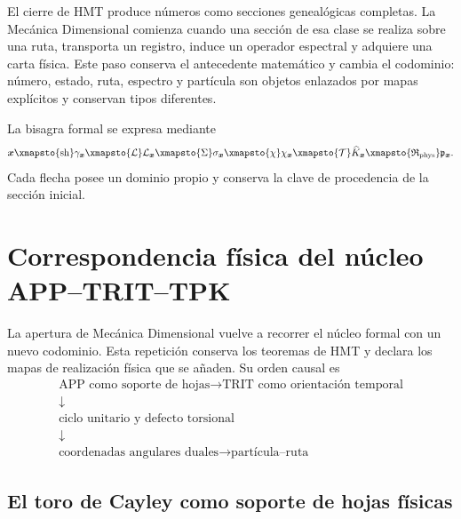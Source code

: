 \label{chap:realizacion-espectral-numero-particula}

El cierre de HMT produce números como secciones genealógicas completas. La
Mecánica Dimensional comienza cuando una sección de esa clase se realiza sobre
una ruta, transporta un registro, induce un operador espectral y adquiere una
carta física. Este paso conserva el antecedente matemático y cambia el
codominio: número, estado, ruta, espectro y partícula son objetos enlazados
por mapas explícitos y conservan tipos diferentes.

La bisagra formal se expresa mediante
\begin{equation}
 \boldsymbol x
 \xmapsto{\operatorname{sh}}
 \gamma_{\boldsymbol x}
 \xmapsto{\mathcal L}
 \mathcal L_{\boldsymbol x}
 \xmapsto{\Sigma}
 \sigma_{\boldsymbol x}
 \xmapsto{\chi}
 \chi_{\boldsymbol x}
 \xmapsto{\mathcal T}
 \widehat K_{\boldsymbol x}
 \xmapsto{\mathfrak R_{\rm phys}}
 \mathfrak p_{\boldsymbol x}.
 \label{eq:bisagra-numero-espectro-particula}
\end{equation}
Cada flecha posee un dominio propio y conserva la clave de procedencia de la
sección inicial.

\section{Correspondencia física del núcleo APP--TRIT--TPK}
\label{sec:reaplicacion-fisica-app-trit-tpk}

La apertura de Mecánica Dimensional vuelve a recorrer el núcleo formal con
un nuevo codominio. Esta repetición conserva los teoremas de HMT y declara
los mapas de realización física que se añaden. Su orden causal es
\[
 \boxed{\begin{gathered}
 \text{APP como soporte de hojas}
 \longrightarrow \text{TRIT como orientación temporal}\\
 \downarrow\\[-1mm]
 \text{ciclo unitario y defecto torsional}\\
 \downarrow\\[-1mm]
 \text{coordenadas angulares duales}
 \longrightarrow \text{partícula--ruta}
 \end{gathered}}
\]

\subsection{El toro de Cayley como soporte de hojas físicas}

